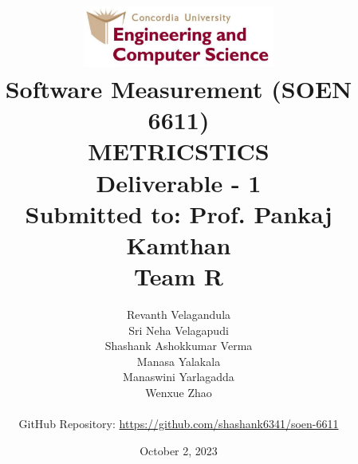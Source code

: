\documentclass[letterpaper]{report}
\begin{document}
\setcounter{secnumdepth}{0}
\begin{titlepage}
\title{\includegraphics[height=2.0cm]{concordia_comp.png}
\vspace{2cm}\\Software Measurement (SOEN 6611)\\[.5em]
METRICSTICS\\[.5em]
Deliverable - 1\\[.5em]
{\fontsize{15}{8}\selectfont Submitted to: Prof. Pankaj Kamthan} \\
\vspace{1cm}
{\fontsize{15}{8}\selectfont \textbf {Team R}}
}
\author{Revanth Velagandula\\
Sri Neha Velagapudi \\
Shashank Ashokkumar Verma\\
Manasa Yalakala\\
Manaswini Yarlagadda\\
Wenxue Zhao\\
\\
\vspace{1cm}
\textnormal{GitHub Repository:}
\url{https://github.com/shashank6341/soen-6611}
}
\date{October 2, 2023\\[.5em]}

\end{titlepage}


\maketitle
\tableofcontents

\pagebreak

\pagebreak





\clearpage
{}
{}
\end{document}
